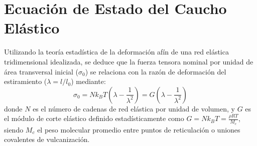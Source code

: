 \section{Ecuación de Estado del Caucho Elástico}

Utilizando la teoría estadística de la deformación afín de una red elástica tridimensional idealizada, se deduce que la fuerza tensora nominal por unidad de área transversal inicial ($\sigma_0$) se relaciona con la razón de deformación del estiramiento ($\lambda = l / l_0$) mediante:
\begin{equation}
    \sigma_0 = N k_B T \left( \lambda - \frac{1}{\lambda^2} \right) = G \left( \lambda - \frac{1}{\lambda^2} \right)
    \label{eq:estado_caucho}
\end{equation}
donde $N$ es el número de cadenas de red elástica por unidad de volumen, y $G$ es el módulo de corte elástico definido estadísticamente como $G = N k_B T = \frac{\rho R T}{M_c}$, siendo $M_c$ el peso molecular promedio entre puntos de reticulación o uniones covalentes de vulcanización.
